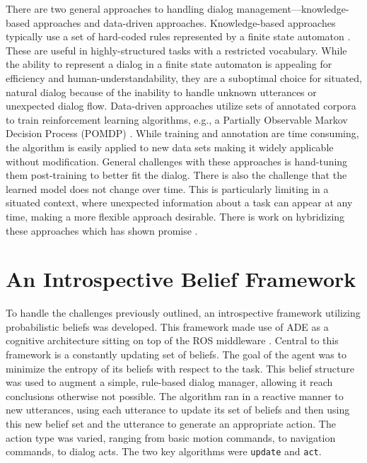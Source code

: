 \documentclass[12pt]{article}
\begin{document}
There are two general approaches to handling dialog
management---knowledge-based approaches and data-driven approaches.
Knowledge-based approaches typically use a set of hard-coded rules
represented by a finite state automaton
\cite{Lee2010:dialog-management}. These are useful in
highly-structured tasks with a restricted vocabulary. While the
ability to represent a dialog in a finite state automaton is appealing
for efficiency and human-understandability, they are a suboptimal
choice for situated, natural dialog because of the inability to handle
unknown utterances or unexpected dialog flow. Data-driven approaches
utilize sets of annotated corpora to train reinforcement learning
algorithms, e.g., a Partially Observable Markov Decision Process
(POMDP) \cite{Young2013:dialog-pomdp}. While training and annotation
are time consuming, the algorithm is easily applied to new data sets
making it widely applicable without modification. General challenges
with these approaches is hand-tuning them post-training to better fit
the dialog. There is also the challenge that the learned model does
not change over time. This is particularly limiting in a situated
context, where unexpected information about a task can appear at any
time, making a more flexible approach desirable. There is work on
hybridizing these approaches which has shown promise
\cite{Lee2010:robust_dialog}.

\section{An Introspective Belief Framework}
\label{sec:framework}
To handle the challenges previously outlined, an introspective
framework utilizing probabilistic beliefs was developed. This
framework made use of ADE \cite{Andronache2004:ade} as a cognitive
architecture sitting on top of the ROS middleware \cite{Quigley2009}.
Central to this framework is a constantly updating set of beliefs. The
goal of the agent was to minimize the entropy of its beliefs with
respect to the task. This belief structure was used to augment a
simple, rule-based dialog manager, allowing it reach conclusions
otherwise not possible. The algorithm ran in a reactive manner to new
utterances, using each utterance to update its set of beliefs and then
using this new belief set and the utterance to generate an appropriate
action. The action type was varied, ranging from basic motion
commands, to navigation commands, to dialog acts. The two key
algorithms were \texttt{update} and \texttt{act}.
\end{document}

